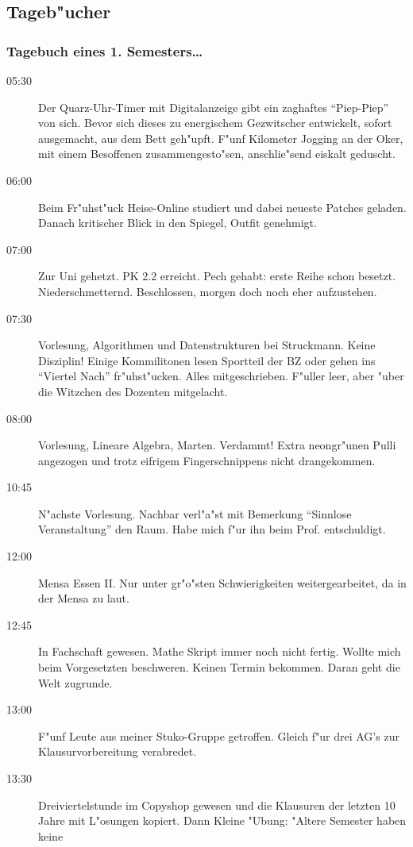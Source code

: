 \subsection{Tageb"ucher}
\subsubsection{Tagebuch eines 1. Semesters\ldots}

\begin{description}
\item[05:30] Der Quarz-Uhr-Timer mit Digitalanzeige gibt ein zaghaftes "`Piep-Piep"'
von sich. Bevor sich dieses zu energischem Gezwitscher entwickelt, sofort
ausgemacht, aus dem Bett geh"upft. F"unf Kilometer Jogging an der Oker,
mit einem Besoffenen zusammengesto"sen, anschlie"send eiskalt geduscht.
\item[06:00] Beim Fr"uhst"uck Heise-Online studiert und dabei neueste Patches geladen.
Danach kritischer Blick in den Spiegel, Outfit genehmigt.
\item[07:00] Zur Uni gehetzt. PK 2.2 erreicht. Pech gehabt: erste Reihe schon besetzt.
Niederschmetternd. Beschlossen, morgen doch noch eher aufzustehen.
\item[07:30] Vorlesung, Algorithmen und Datenstrukturen bei Struckmann. Keine Disziplin!
Einige Kommilitonen lesen
Sportteil der BZ oder gehen ins "`Viertel Nach"' fr"uhst"ucken. Alles
mitgeschrieben. F"uller leer, aber "uber die Witzchen des Dozenten mitgelacht.
\item[08:00] Vorlesung, Lineare Algebra, Marten. Verdammt! Extra neongr"unen Pulli
angezogen und trotz eifrigem Fingerschnippens nicht drangekommen.
\item[10:45] N"achste Vorlesung. Nachbar verl"a"st mit Bemerkung "`Sinnlose
Veranstaltung"' den Raum. Habe mich f"ur ihn beim Prof. entschuldigt.
\item[12:00] Mensa Essen II. Nur unter gr"o"sten Schwierigkeiten
weitergearbeitet, da in der Mensa zu laut.
\item[12:45] In Fachschaft gewesen. Mathe Skript immer noch nicht fertig. Wollte
mich beim Vorgesetzten beschweren. Keinen Termin bekommen. Daran geht die
Welt zugrunde.
\item[13:00] F"unf Leute aus meiner Stuko-Gruppe getroffen. Gleich f"ur drei AG's zur
Klausurvorbereitung verabredet.
\item[13:30] Dreiviertelstunde im Copyshop gewesen und die Klausuren der letzten 10
Jahre mit L"osungen kopiert. Dann Kleine "Ubung: "Altere Semester haben keine

\end{description}
